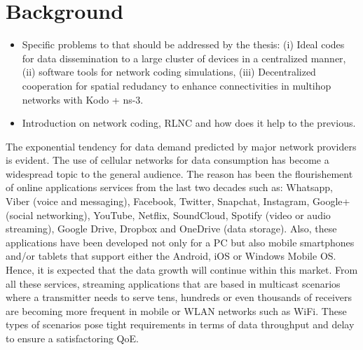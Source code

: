 \section{Background}\label{sec:background}

\begin{itemize}
\item Specific problems to that should be addressed by the thesis: (i) Ideal codes for data dissemination to a large cluster of devices in a centralized manner, (ii) software tools for network coding simulations, (iii) Decentralized cooperation for spatial redudancy to enhance connectivities in multihop networks with Kodo + ns-3.
\item Introduction on network coding, RLNC and how does it help to the previous.
\end{itemize}

The exponential tendency for data demand predicted by major network providers \cite{cisco2016forecast,kremling2015presentation} is evident. The use of cellular networks for data consumption has become a widespread topic to the general audience. The reason has been the flourishement of online applications services from the last two decades such as:  Whatsapp, Viber (voice and messaging), Facebook, Twitter, Snapchat, Instagram, Google+ (social networking), YouTube, Netflix, SoundCloud, Spotify (video or audio streaming), Google Drive, Dropbox and OneDrive (data storage). Also, these applications have been developed not only for a \ac{PC} but also mobile smartphones and/or tablets that support either the Android, iOS or Windows Mobile \ac{OS}. Hence, it is expected that the data growth will continue within this market. From all these services, streaming applications that are based in multicast scenarios where a transmitter needs to serve tens, hundreds or even thousands of receivers are becoming more frequent in mobile or \ac{WLAN} networks such as \ac{WiFi}. These types of scenarios pose tight requirements in terms of data throughput and delay to ensure a satisfactoring \ac{QoE}.

